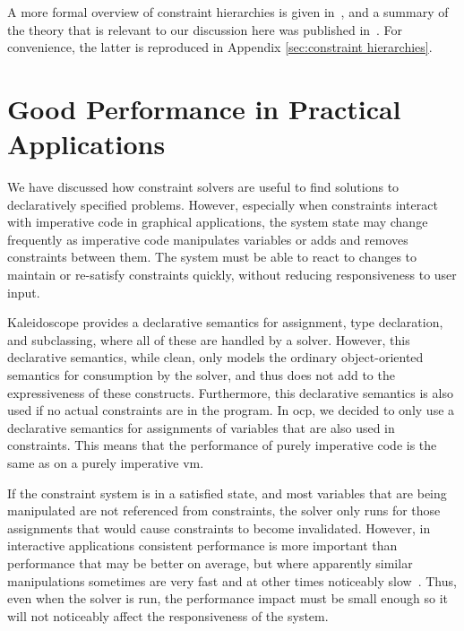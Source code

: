 A more formal overview of constraint hierarchies is given in~\cite{borning1992constraint}, and a summary of the theory that is relevant to
our discussion here was published in~\cite{FelgentreffJOT14}. For convenience,
the latter is reproduced in Appendix \ref{sec:constraint hierarchies}.

\section{Good Performance in Practical Applications}

We have discussed how constraint solvers are useful to find solutions
to declaratively specified problems. However, especially when
constraints interact with imperative code in graphical applications,
the system state may change frequently as imperative code manipulates
variables or adds and removes constraints between them. The system
must be able to react to changes to maintain or re-satisfy constraints
quickly, without reducing responsiveness to user input.

Kaleidoscope provides a declarative semantics for assignment, type declaration,
and subclassing, where all of these are handled by a solver. However, this
declarative semantics, while clean, only models the ordinary object-oriented
semantics for consumption by the solver, and thus does not add to the
expressiveness of these constructs. Furthermore, this declarative semantics is
also used if no actual constraints are in the program. In \ac{ocp}, we decided
to only use a declarative semantics for assignments of variables that are also
used in constraints. This means that the performance of purely imperative code
is the same as on a purely imperative \ac{vm}.

If the constraint system is in a satisfied state, and most variables
that are being manipulated are not referenced from constraints, the
solver only runs for those assignments that would cause constraints to
become invalidated.  However, in interactive applications consistent
performance is more important than performance that may be better on
average, but where apparently similar manipulations sometimes are very
fast and at other times noticeably slow~\cite{chambers1989efficient}. Thus, even
when the solver is run, the performance impact must be small enough so
it will not noticeably affect the responsiveness of the system.

